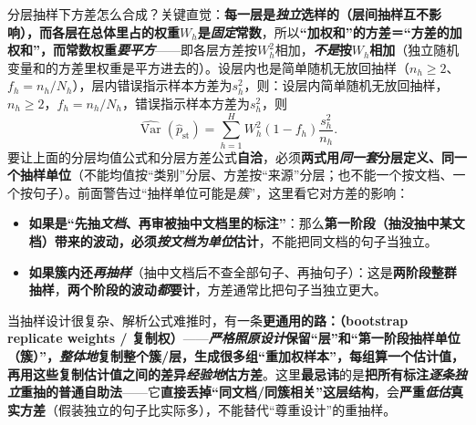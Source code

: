 分层抽样下方差怎么合成？关键直觉：\textbf{每一层是\emph{独立}选样的（层间抽样互不影响），而各层在总体里占的权重$W_h$是\emph{固定}常数}，所以\textbf{“加权和”的方差＝“方差的加权和”，而\textbf{常数权重\emph{要平方}}}——即各层方差按$W_h^2$相加，\textbf{\emph{不是}按$W_h$相加}（独立随机变量和的方差里权重是平方进去的）。设层内也是简单随机无放回抽样（$n_h\geq2$、$f_h=n_h/N_h$），层内错误指示样本方差为$s_h^2$，则：设层内简单随机无放回抽样，$n_h\geq2$，$f_h=n_h/N_h$，错误指示样本方差为$s_h^2$，则
\begin{equation}
  \widehat{\operatorname{Var}}(\widehat p_{\mathrm{st}})
  =
  \sum_{h=1}^{H}
  W_h^2(1-f_h)\frac{s_h^2}{n_h}.
  \label{eq:knowledge-quality-assessment-correction-stratified-variance}
\end{equation}
要让上面的分层均值公式和分层方差公式\textbf{自洽}，必须\textbf{两式用\emph{同一套}分层定义、同一个抽样单位}（不能均值按“类别”分层、方差按“来源”分层；也不能一个按文档、一个按句子）。前面警告过“抽样单位可能是\emph{簇}”，这里看它对方差的影响：
\begin{itemize}\item \textbf{如果是“先抽\emph{文档}、再审被抽中文档里的标注”}：那么\textbf{第一阶段（抽没抽中某文档）带来的波动，必须\emph{按文档为单位}估计}，不能把同文档的句子当独立。\item \textbf{如果簇内还\emph{再抽样}}（抽中文档后不查全部句子、再抽句子）：这是\textbf{两阶段整群抽样}，\textbf{两个阶段的波动\emph{都}要计}，方差通常比把句子当独立更大。\end{itemize}
当抽样设计很复杂、解析公式难推时，有一条\textbf{更通用的路：（bootstrap replicate weights / 复制权）}——\textbf{\emph{严格照原设计}保留“层”和“第一阶段抽样单位（簇）”，\emph{整体地}复制整个簇/层，生成很多组“重加权样本”，每组算一个估计值，再用这些复制估计值之间的差异\emph{经验地}估方差}。这里\textbf{最忌讳}的是\textbf{把所有标注\emph{逐条独立}重抽的普通自助法}——它\textbf{直接丢掉“同文档/同簇相关”这层结构}，会\textbf{严重\emph{低估}真实方差}（假装独立的句子比实际多），不能替代“尊重设计”的重抽样。


